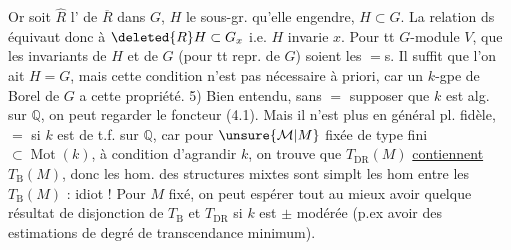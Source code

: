 Or soit $\widehat R$ l' de $\overline R$ dans $G$, $H$ le sous-gr. qu'elle engendre, $H\subset G$.  La relation ds équivaut donc à $\deleted{R}H\subset G_x$ i.e. $H$ invarie $x$.
Pour tt $G$-module $V$, 
 que les invariants de $H$ et de $G$ (pour tt repr. de $G$) soient les $=$s. Il suffit que l'on ait $H=G$, mais cette condition n'est pas nécessaire à priori, car un $k$-gpe de Borel de $G$ a cette propriété.
5) Bien entendu, sans $=$ supposer que $k$ est alg. sur $\mathbb Q$, on peut regarder le foncteur (4.1). Mais il n'est plus en général pl. fidèle, $=$ si $k$ est de t.f. sur $\mathbb Q$, car pour $\unsure{\mathcal M|M}$  fixée de type fini $\subset\operatorname{Mot}(k)$, à condition d'agrandir $k$, on trouve que  $T_{\mathrm{DR}}(M)$ \uline{contiennent} $T_{\mathrm B}(M)$, donc les hom. des structures mixtes sont simplt les hom entre les $T_{\mathrm B}(M)$ : idiot !
Pour $M$ fixé, on peut espérer tout au mieux avoir quelque résultat de disjonction de $T_{\mathrm B}$ et $T_{\mathrm{DR}}$ si $k$ est $\pm$ modérée (p.ex avoir des estimations de degré de transcendance minimum).



